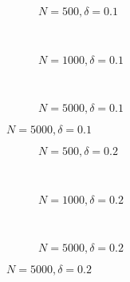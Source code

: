 \documentclass{beamer}
\begin{document}
\begin{frame}
  \begin{center}
    {}
  \end{center}
\end{frame}
\begin{frame}
\begin{figure}[h]
  \scriptsize
  \begingroup
  \centering
  \begin{subfigure}[b]{0.31\textwidth}
\caption{\footnotesize $N=500, \delta = 0.1$}
  
  \end{subfigure}
  ~
  \begin{subfigure}[b]{0.31\textwidth}
    \caption{\footnotesize $N=1000, \delta = 0.1$} 
  
  \end{subfigure}
  ~
  \begin{subfigure}[b]{0.31\textwidth}
\caption{\footnotesize $N=5000, \delta = 0.1$}
  
  \end{subfigure}
\endgroup
\end{figure}
\end{frame}
\begin{frame}
\begin{figure}[h]
  \scriptsize
  \begingroup
  \centering
  \begin{subfigure}[b]{0.31\textwidth}
\caption{\footnotesize $N=500, \delta = 0.2$}
  
  \end{subfigure}
  ~
  \begin{subfigure}[b]{0.31\textwidth}
    \caption{\footnotesize $N=1000, \delta = 0.2$} 
  
  \end{subfigure}
  ~
  \begin{subfigure}[b]{0.31\textwidth}
\caption{\footnotesize $N=5000, \delta = 0.2$}
  
  \end{subfigure}
\endgroup
\end{figure}
\end{frame}
\end{document}
